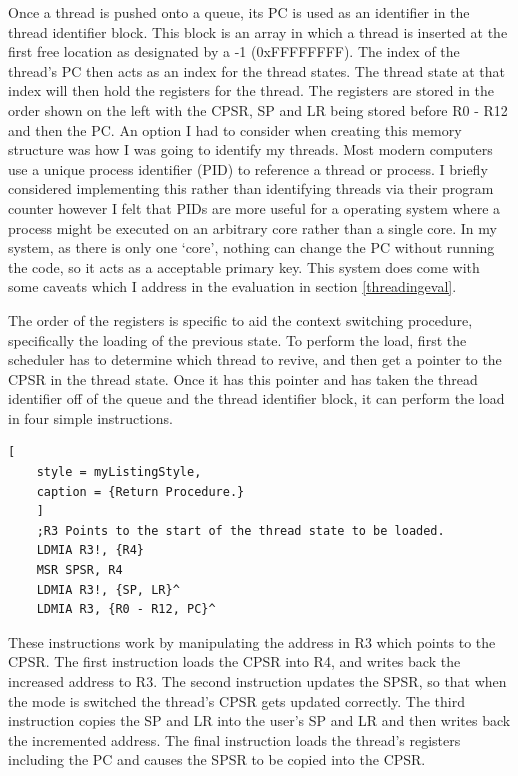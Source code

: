 Once a thread is pushed onto a queue, its PC is used as an identifier in the thread identifier block. This block is an array in which a thread is inserted at the first free location as designated by a -1 (0xFFFFFFFF). The index of the thread's PC then acts as an index for the thread states. The thread state at that index will then hold the registers for the thread. The registers are stored in the order shown on the left with the CPSR, SP and LR being stored before R0 - R12 and then the PC. An option I had to consider when creating this memory structure was how I was going to identify my threads. Most modern computers use a unique process identifier (PID) to reference a thread or process. %
I briefly considered implementing this rather than identifying threads via their program counter however I felt that PIDs are more useful for a operating system where a process might be executed on an arbitrary core rather than a single core. In my system, as there is only one `core', nothing can change the PC without running the code, so it acts as a acceptable primary key. This system does come with some caveats which I address in the evaluation in section \ref{threadingeval}.

The order of the registers is specific to aid the context switching procedure, specifically the loading of the previous state. To perform the load, first the scheduler has to determine which thread to revive, and then get a pointer to the CPSR in the thread state. Once it has this pointer and has taken the thread identifier off of the queue and the thread identifier block, it can perform the load in four simple instructions.

\begin{lstlisting}[
	style = myListingStyle,
	caption = {Return Procedure.}
	]
	;R3 Points to the start of the thread state to be loaded.
	LDMIA R3!, {R4}
	MSR SPSR, R4
	LDMIA R3!, {SP, LR}^
	LDMIA R3, {R0 - R12, PC}^
\end{lstlisting}

These instructions work by manipulating the address in R3 which points to the CPSR. The first instruction loads the CPSR into R4, and writes back the increased address to R3. The second instruction updates the SPSR, so that when the mode is switched the thread's CPSR gets updated correctly. The third instruction copies the SP and LR into the user's SP and LR and then writes back the incremented address. The final instruction loads the thread's registers including the PC and causes the SPSR to be copied into the CPSR.

